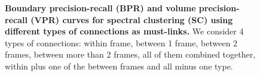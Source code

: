 \begin{figure}[htbp]
\begin{minipage}[t]{1\textwidth}
\setcounter{subfigure}{0}
\hfill \hfill   
{} 
\hfill  
{} 
\hfill 
{} 
\hfill   \hfill
\end{minipage}

\caption[Boundary precision-recall and volume precision-recall curves for spectral clustering using different types of connections as must-links]{
{\bf Boundary precision-recall (BPR) and volume precision-recall (VPR) curves for spectral clustering (SC) using different types of connections as must-links.} We consider 4 types of connections: within frame, 
between 1 frame, between 2 frames, between more than 2 frames, all of them combined together, within plus one of the between frames and all minus one type.}
\label{fig:sc_ML_res}
\end{figure}

